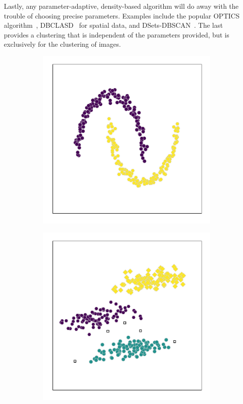 Lastly, any parameter-adaptive, density-based algorithm will do away with the
trouble of choosing precise parameters. Examples include the popular OPTICS
algorithm~\cite{Ankerst1999}, DBCLASD~\cite{Xu1998} for spatial data, and
DSets-DBSCAN~\cite{Hou2016}. The last provides a clustering that is independent
of the parameters provided, but is exclusively for the clustering of images.

\begin{figure}
    \centering
    \begin{subfigure}{.333\textwidth}
        \includegraphics[width=\linewidth]{dbscan/moons}
        \caption{}\label{fig:dbscan_moons}
    \end{subfigure}%
    \hfill%
    \begin{subfigure}{.333\textwidth}
        \includegraphics[width=\linewidth]{dbscan/ellipses}

\end{subfigure}
\end{figure}

